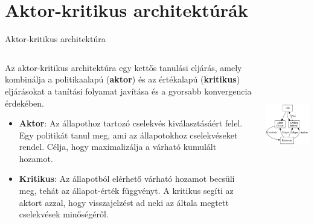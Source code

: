 \documentclass[english, aspectratio=169]{beamer}
\makeatletter
\let\origtableofcontents=\tableofcontents
\def\tableofcontents{\@ifnextchar[{\origtableofcontents}{\gobbletableofcontents}}
\def\gobbletableofcontents#1{\origtableofcontents}
\makeatother
\begin{document}
\section{Aktor-kritikus architektúrák}

\begin{frame}
\tableofcontents[currentsection]
\end{frame}

\begin{frame}{Aktor-kritikus architektúra}
\begin{columns}
\begin{column}{.6\textwidth}
Az aktor-kritikus architektúra egy kettős tanulási eljárás, amely kombinálja a politikaalapú (\textbf{aktor}) és az értékalapú (\textbf{kritikus}) eljárásokat a tanítási folyamat javítása és a gyorsabb konvergencia érdekében.\par\smallskip
\begin{itemize}
	\item \textbf{Aktor}: Az állapothoz tartozó cselekvés kiválasztásáért felel. Egy politikát tanul meg, ami az állapotokhoz cselekvéseket rendel. Célja, hogy maximalizálja a várható kumulált hozamot. 
	\item \textbf{Kritikus}: Az állapotból elérhető várható hozamot becsüli meg, tehát az állapot-érték függvényt. A kritikus segíti az aktort azzal, hogy visszajelzést ad neki az általa megtett cselekvések minőségéről. 
\end{itemize}
\end{column}
\begin{column}{.4\textwidth}
\begin{center}
\includegraphics[height=5.5cm, keepaspectratio]{graphs/dql_7.png}
\end{center}
\end{column}
\end{columns}
\end{frame}
\end{document}
